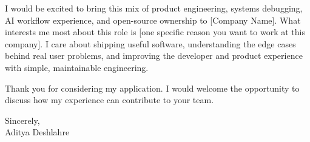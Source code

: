 \documentclass[letterpaper,11pt]{article}
\newcommand{\candidateName}{Aditya Deshlahre}
\newcommand{\companyName}{[Company Name]}
\newcommand{\companyReason}{[one specific reason you want to work at this company]}
\begin{document}
I would be excited to bring this mix of product engineering, systems debugging, AI workflow experience, and open-source ownership to \companyName. What interests me most about this role is \companyReason. I care about shipping useful software, understanding the edge cases behind real user problems, and improving the developer and product experience with simple, maintainable engineering.

Thank you for considering my application. I would welcome the opportunity to discuss how my experience can contribute to your team.

Sincerely,\\
\candidateName










\end{document}
